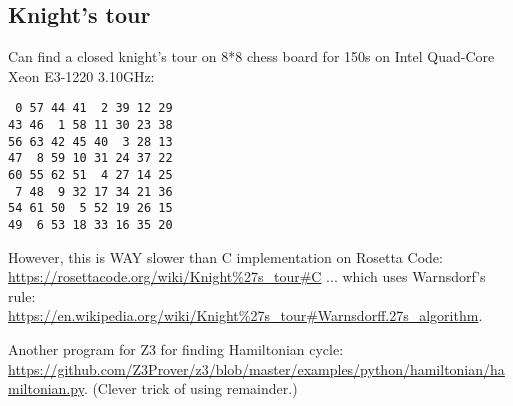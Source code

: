 \subsection{Knight's tour}



Can find a closed knight's tour on 8*8 chess board for 150s on Intel Quad-Core Xeon E3-1220 3.10GHz:

\begin{lstlisting}
 0 57 44 41  2 39 12 29
43 46  1 58 11 30 23 38
56 63 42 45 40  3 28 13
47  8 59 10 31 24 37 22
60 55 62 51  4 27 14 25
 7 48  9 32 17 34 21 36
54 61 50  5 52 19 26 15
49  6 53 18 33 16 35 20
\end{lstlisting}

However, this is WAY slower than C implementation on Rosetta Code: \url{https://rosettacode.org/wiki/Knight%27s_tour#C}
... which uses Warnsdorf's rule: \url{https://en.wikipedia.org/wiki/Knight%27s_tour#Warnsdorff.27s_algorithm}.

Another program for Z3 for finding Hamiltonian cycle: \url{https://github.com/Z3Prover/z3/blob/master/examples/python/hamiltonian/hamiltonian.py}.
(Clever trick of using remainder.)

